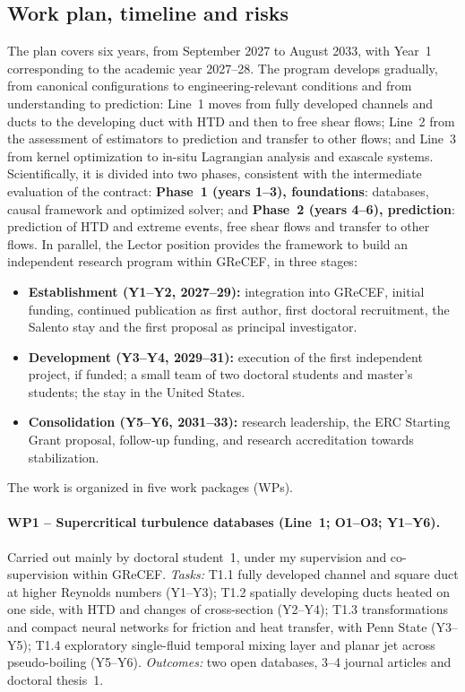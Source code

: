 \documentclass[11pt]{article}
\begin{document}
\subsection{Work plan, timeline and risks}\label{sec:workplan}
The plan covers six years, from September 2027 to August 2033, with Year~1 corresponding to
the academic year 2027--28. The program develops gradually, from canonical configurations to
engineering-relevant conditions and from understanding to prediction: Line~1 moves from fully
developed channels and ducts to the developing duct with HTD and then to free shear flows;
Line~2 from the assessment of estimators to prediction and transfer to other flows; and Line~3
from kernel optimization to in-situ Lagrangian analysis and exascale systems. Scientifically, it is divided into two phases, consistent with the
intermediate evaluation of the contract: \textbf{Phase~1 (years 1--3), foundations}:
databases, causal framework and optimized solver; and \textbf{Phase~2 (years 4--6),
prediction}: prediction of HTD and extreme events, free shear flows and transfer to other
flows. In parallel, the Lector position
provides the framework to build an independent research program within GReCEF, in three
stages:
\begin{itemize}
  \item \textbf{Establishment (Y1--Y2, 2027--29):} integration into GReCEF, initial funding,
  continued publication as first author, first doctoral recruitment, the Salento stay and the first proposal as principal
  investigator.
  \item \textbf{Development (Y3--Y4, 2029--31):} execution of the first independent project,
  if funded; a small team of two doctoral students and master's students; the stay in the
  United States.
  \item \textbf{Consolidation (Y5--Y6, 2031--33):} research leadership, the ERC Starting Grant
  proposal, follow-up funding, and research accreditation towards stabilization.
\end{itemize}
The work is organized in five work packages (WPs).

\paragraph{WP1 -- Supercritical turbulence databases (Line~1; O1--O3; Y1--Y6).} Carried out
mainly by doctoral student~1, under my supervision and co-supervision within GReCEF.
\emph{Tasks:} T1.1 fully developed channel and square duct at higher Reynolds numbers
(Y1--Y3); T1.2 spatially developing ducts heated on one side, with HTD and changes of cross-section (Y2--Y4); T1.3 transformations
and compact neural networks for friction and heat transfer, with Penn State (Y3--Y5); T1.4
exploratory single-fluid temporal mixing layer and planar jet across pseudo-boiling (Y5--Y6).
\emph{Outcomes:} two open databases, 3--4 journal articles and doctoral thesis~1.
\end{document}
